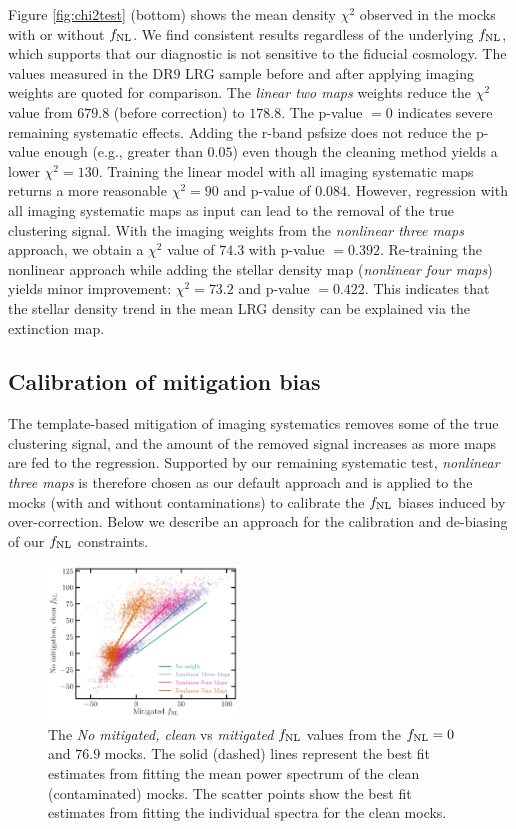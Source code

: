 Figure \ref{fig:chi2test} (bottom) shows the mean density $\chi^{2}$ observed in the mocks with or without $f_{\rm NL}$. We find consistent results regardless of the underlying $f_{\rm NL}$, which supports that our diagnostic is not sensitive to the fiducial cosmology. The values measured in the DR9 LRG sample before and after applying imaging weights are quoted for comparison. The \textit{linear two maps} weights reduce the $\chi^{2}$ value from $679.8$ (before correction) to $178.8$. The p-value $=0$ indicates severe remaining systematic effects. Adding the r-band psfsize does not reduce the p-value enough (e.g., greater than $0.05$) even though the cleaning method yields a lower $\chi^{2}=130$. Training the linear model with all imaging systematic maps returns a more reasonable $\chi^{2}=90$ and p-value of $0.084$. However, regression with all imaging systematic maps as input can lead to the removal of the true clustering signal. With the imaging weights from the \textit{nonlinear three maps} approach, we obtain a $\chi^{2}$ value of $74.3$ with p-value $=0.392$. Re-training the nonlinear approach while adding the stellar density map (\textit{nonlinear four maps}) yields minor improvement: $\chi^{2}=73.2$ and p-value $=0.422$.  This indicates that the stellar density trend in the mean LRG density can be explained via the extinction map.




\subsection{Calibration of mitigation bias}\label{ssec:calibration}
The template-based mitigation of imaging systematics removes some of the true clustering signal, and the amount of the removed signal increases as more maps are fed to the regression. Supported by our remaining systematic test, \textit{nonlinear three maps} is therefore chosen as our default approach and is applied to the mocks (with and without contaminations) to calibrate the $f_{\rm NL}$ biases induced by over-correction. Below we describe an approach for the calibration and de-biasing of our $f_{\rm NL}$ constraints. 

\begin{figure}
\centering
\includegraphics[width=0.45\textwidth]{figures/fnlbias}
\caption{The \textit{No mitigated, clean} vs \textit{mitigated} $f_{\rm NL}$ values from the $f_{\rm NL}=0$ and $76.9$ mocks. The solid (dashed) lines represent the best fit estimates from fitting the mean power spectrum of the clean (contaminated) mocks. The scatter points show the best fit estimates from fitting the individual spectra for the clean mocks.}\label{fig:fnlbias}
\end{figure}

